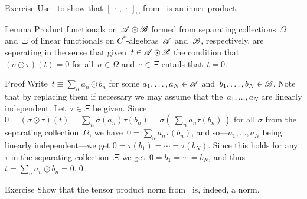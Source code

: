 \documentclass[a]{subfiles}
\begin{document}
\begin{parsec}
\begin{point}{Exercise}
Use~ 
to show that
 $[\,\cdot\,,\,\cdot\,]_\omega$
from~
is an inner product.
\end{point}
\begin{point}{Lemma}%
Product functionals on~$\mathscr{A}\odot\mathscr{B}$
formed from 
separating
collections~$\Omega$ and~$\Xi$ 
of linear functionals
on $C^*$-algebras~$\mathscr{A}$ and~$\mathscr{B}$,
respectively,
are seperating
in the sense that given~$t\in\mathscr{A}\odot\mathscr{B}$
the condition that $(\sigma\odot \tau)(t)=0$
for all~$\sigma\in \Omega$ and~$\tau\in\Xi$
entails that~$t=0$.
\begin{point}{Proof}%
Write~$t\equiv \sum_n a_n\odot b_n$
for some  $a_1,\dotsc,a_N\in\mathscr{A}$
and~$b_1,\dotsc,b_N\in \mathscr{B}$.
Note that by replacing them if necessary
we may assume that the~$a_1,\dotsc,a_N$
are linearly independent.
Let~$\tau\in\Xi$ be given.
Since~$0=(\sigma\odot \tau)(t)
= \sum_n\sigma(a_n)\tau(b_n)
= \sigma(\,\sum_n a_n\tau(b_n)\,)$
for all $\sigma$ from the separating collection~$\Omega$,
we have~$0=\sum_n a_n\tau(b_n)$,
and so---$a_1,\dotsc,a_N$ being linearly independent---we get
 $0=\tau(b_1)=\dotsb = \tau(b_N)$.
Since this holds for any~$\tau$
in the separating collection~$\Xi$
we get~$0=b_1=\dotsb=b_N$,
and thus~$t=\sum_n a_n\odot b_n=0$.\qed
\end{point}
\end{point}
\begin{point}{Exercise}%
Show that the tensor product norm
from~
is, indeed, a norm.
\end{point}
\end{parsec}
\end{document}
